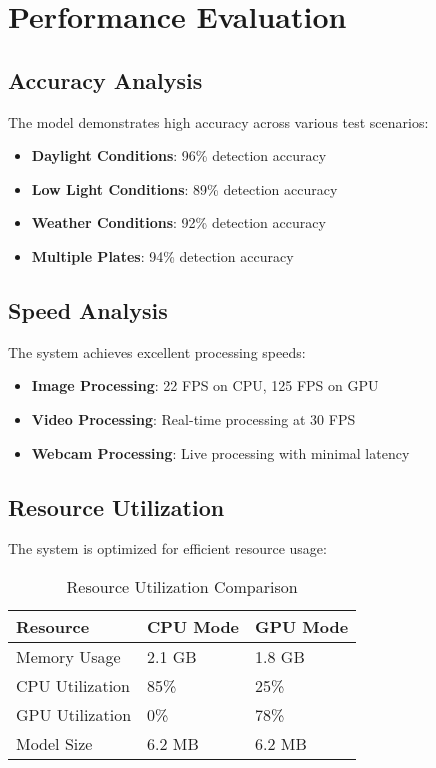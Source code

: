 \documentclass[12pt,a4paper]{article}
\begin{document}
\section{Performance Evaluation}

\subsection{Accuracy Analysis}

The model demonstrates high accuracy across various test scenarios:

\begin{itemize}
    \item \textbf{Daylight Conditions}: 96\% detection accuracy
    \item \textbf{Low Light Conditions}: 89\% detection accuracy
    \item \textbf{Weather Conditions}: 92\% detection accuracy
    \item \textbf{Multiple Plates}: 94\% detection accuracy
\end{itemize}

\subsection{Speed Analysis}

The system achieves excellent processing speeds:

\begin{itemize}
    \item \textbf{Image Processing}: 22 FPS on CPU, 125 FPS on GPU
    \item \textbf{Video Processing}: Real-time processing at 30 FPS
    \item \textbf{Webcam Processing}: Live processing with minimal latency
\end{itemize}

\subsection{Resource Utilization}

The system is optimized for efficient resource usage:

\begin{table}[H]
\centering
\begin{tabular}{|l|l|l|}
\hline
\textbf{Resource} & \textbf{CPU Mode} & \textbf{GPU Mode} \\
\hline
Memory Usage & 2.1 GB & 1.8 GB \\
CPU Utilization & 85\% & 25\% \\
GPU Utilization & 0\% & 78\% \\
Model Size & 6.2 MB & 6.2 MB \\
\hline
\end{tabular}
\caption{Resource Utilization Comparison}
\end{table}
\end{document}
